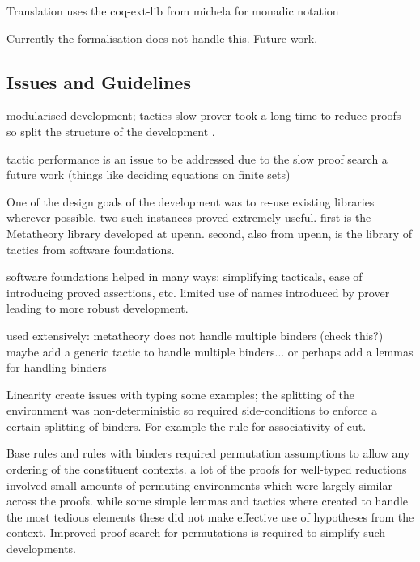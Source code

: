 Translation uses the coq-ext-lib from michela for monadic notation

Currently the formalisation does not handle this. Future work.


\subsection{Issues and Guidelines}

modularised development; tactics slow prover took a long time to reduce proofs
so split the structure of the development .

tactic performance is an issue to be addressed due to the slow proof search a
future work (things like deciding equations on finite sets)

One of the design goals of the development was to re-use existing libraries
wherever possible. two such instances proved extremely useful. first is the
Metatheory library developed at upenn. second, also from upenn, is the library
of tactics from software foundations.

software foundations helped in many ways: simplifying tacticals, ease of
introducing proved assertions, etc. limited use of names introduced by prover
leading to more robust development.

used extensively: metatheory does not handle multiple binders (check this?)
maybe add a generic tactic to handle multiple binders... or perhaps add a
lemmas for handling binders

Linearity create issues with typing some examples; the splitting of the
environment was non-deterministic so required side-conditions to enforce a
certain splitting of binders. For example the rule for associativity of
cut. 

Base rules and rules with binders required permutation assumptions to allow
any ordering of the constituent contexts. a lot of the proofs for well-typed
reductions involved small amounts of permuting environments which were largely
similar across the proofs. while some simple lemmas and tactics where created
to handle the most tedious elements these did not make effective use of
hypotheses from the context. Improved proof search for permutations is
required to simplify such developments.

